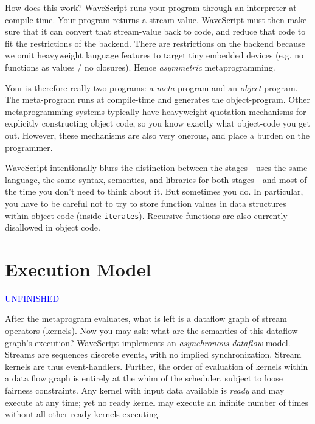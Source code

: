 \documentclass[twocolumn]{report}
\newcommand{\rednote}[1]{{\textcolor{blue}{#1}}}
\newcommand{\cde}{\tt}
\begin{document}
How does this work?  
WaveScript runs your program through an interpreter at compile time.
Your program returns a stream value.  WaveScript must then make sure
that it can convert that stream-value back to code, and reduce that
code to fit the restrictions of the backend.  There are restrictions
on the backend because we omit heavyweight language features to target
tiny embedded devices (e.g. no functions as values / no closures).
Hence {\em asymmetric} metaprogramming.

Your is therefore really two programs: a {\em meta-}program and an {\em
  object}-program.  The meta-program runs at compile-time and
  generates the object-program.  Other metaprogramming systems
  typically have heavyweight quotation mechanisms for explicitly
  constructing object code, so you know exactly what object-code you
  get out.  However, these mechanisms are also very onerous, and place
  a burden on the programmer.  

WaveScript intentionally blurs the distinction between the
stages---uses the same language, the same syntax, semantics, and
libraries for both stages---and most of the time you don't need to
think about it.  But sometimes you do.  In particular, you have to be
careful not to try to store function values in data structures within
object code (inside {\cde iterates}).  Recursive functions are also
currently disallowed in object code.




\section{Execution Model}

\rednote{UNFINISHED}

After the metaprogram evaluates, what is left is a dataflow graph of
stream operators (kernels).  Now you may ask: what are the semantics
of this dataflow graph's execution?  WaveScript implements an {\em
asynchronous dataflow} model.  Streams are sequences discrete events,
with no implied synchronization.  Stream kernels are thus
event-handlers.  Further, the order of evaluation of kernels within a
data flow graph is entirely at the whim of the scheduler, subject to
loose fairness constraints.  Any kernel with input data available is
{\em ready} and may execute at any time; yet no ready kernel may
execute an infinite number of times without all other ready kernels
executing.
\end{document}
